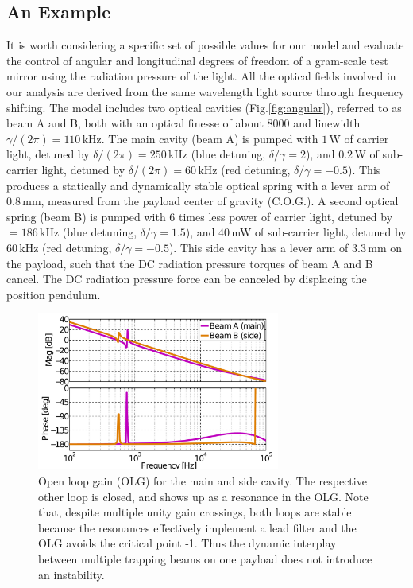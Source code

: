 

\subsection{An Example}

It is worth considering a specific set of possible values for our model and evaluate the control of  angular and longitudinal degrees of freedom of a gram-scale test mirror using the radiation pressure of the light.
All the optical fields involved in our analysis are derived from the same wavelength light source through frequency shifting.
The model includes two optical cavities (Fig.\ref{fig:angular}), referred to as beam A and B, both with an optical finesse of  about $8000$ and linewidth $\gamma/(2 \pi) = 110\,$kHz. 
The main cavity (beam A) is pumped with $1\,$W of carrier light, detuned by $\delta/(2 \pi)= 250\,$kHz (blue detuning, $\delta/\gamma = 2$), and $0.2\,$W of sub-carrier light, detuned by $\delta/(2 \pi) =60\,$kHz (red detuning, $\delta/\gamma = -0.5$). This produces a statically and dynamically stable optical spring with a lever arm of $0.8\,$mm, measured from the payload center of gravity (C.O.G.). A second optical spring (beam B) is pumped with 6 times less power of carrier light, detuned by $=186\,$kHz (blue detuning, $\delta/\gamma=1.5$), and $40\,$mW of sub-carrier light, detuned by $60\,$kHz (red detuning, $\delta/\gamma=-0.5$). This side cavity has a lever arm of $3.3\,$mm on the payload, such that the DC radiation pressure torques of beam A and B cancel. The DC radiation pressure force can be canceled by displacing the position pendulum.

\begin{figure}[htbp]
	\centering
		\includegraphics[width=8cm]{./figures/open_loops_TF_paper2.pdf}%
	\caption[Cavity Open Loop Gains]{{
        Open loop gain (OLG) for the main and side cavity.	The respective other loop is closed, and shows up as a resonance in the OLG. Note that, despite multiple unity gain crossings, both loops are stable because the resonances effectively implement a lead filter and the OLG avoids the critical point -1. Thus the dynamic interplay between multiple trapping beams on one payload does not introduce an instability.}}
	\label{fig:control_loops}
\end{figure}


